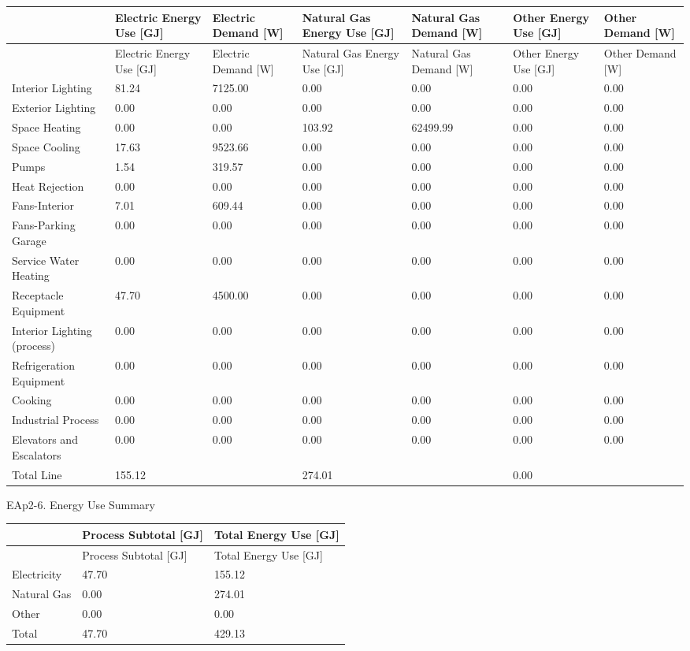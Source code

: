\begin{longtable}[c]{>{\raggedright}p{0.85in}>{\raggedright}p{0.85in}>{\raggedright}p{0.85in}>{\raggedright}p{0.85in}>{\raggedright}p{0.85in}>{\raggedright}p{0.85in}>{\raggedright}p{0.85in}}
\toprule 
 & Electric Energy Use [GJ] & Electric Demand [W] & Natural Gas Energy Use [GJ] & Natural Gas Demand [W] & Other Energy Use [GJ] & Other Demand [W] \tabularnewline
\midrule
\endfirsthead

\toprule 
 & Electric Energy Use [GJ] & Electric Demand [W] & Natural Gas Energy Use [GJ] & Natural Gas Demand [W] & Other Energy Use [GJ] & Other Demand [W] \tabularnewline
\midrule
\endhead

Interior Lighting & 81.24 & 7125.00 & 0.00 & 0.00 & 0.00 & 0.00 \tabularnewline
Exterior Lighting & 0.00 & 0.00 & 0.00 & 0.00 & 0.00 & 0.00 \tabularnewline
Space Heating & 0.00 & 0.00 & 103.92 & 62499.99 & 0.00 & 0.00 \tabularnewline
Space Cooling & 17.63 & 9523.66 & 0.00 & 0.00 & 0.00 & 0.00 \tabularnewline
Pumps & 1.54 & 319.57 & 0.00 & 0.00 & 0.00 & 0.00 \tabularnewline
Heat Rejection & 0.00 & 0.00 & 0.00 & 0.00 & 0.00 & 0.00 \tabularnewline
Fans-Interior & 7.01 & 609.44 & 0.00 & 0.00 & 0.00 & 0.00 \tabularnewline
Fans-Parking Garage & 0.00 & 0.00 & 0.00 & 0.00 & 0.00 & 0.00 \tabularnewline
Service Water Heating & 0.00 & 0.00 & 0.00 & 0.00 & 0.00 & 0.00 \tabularnewline
Receptacle Equipment & 47.70 & 4500.00 & 0.00 & 0.00 & 0.00 & 0.00 \tabularnewline
Interior Lighting (process) & 0.00 & 0.00 & 0.00 & 0.00 & 0.00 & 0.00 \tabularnewline
Refrigeration Equipment & 0.00 & 0.00 & 0.00 & 0.00 & 0.00 & 0.00 \tabularnewline
Cooking & 0.00 & 0.00 & 0.00 & 0.00 & 0.00 & 0.00 \tabularnewline
Industrial Process & 0.00 & 0.00 & 0.00 & 0.00 & 0.00 & 0.00 \tabularnewline
Elevators and Escalators & 0.00 & 0.00 & 0.00 & 0.00 & 0.00 & 0.00 \tabularnewline
Total Line & 155.12 & ~ & 274.01 & ~ & 0.00 & ~ \tabularnewline
\bottomrule
\end{longtable}

EAp2-6. Energy Use Summary

\begin{longtable}[c]{@{}lll@{}}
\toprule 
 & Process Subtotal [GJ] & Total Energy Use [GJ] \tabularnewline
\midrule
\endfirsthead

\toprule 
 & Process Subtotal [GJ] & Total Energy Use [GJ] \tabularnewline
\midrule
\endhead

Electricity & 47.70 & 155.12 \tabularnewline
Natural Gas & 0.00 & 274.01 \tabularnewline
Other & 0.00 & 0.00 \tabularnewline
Total & 47.70 & 429.13 \tabularnewline
\bottomrule
\end{longtable}

